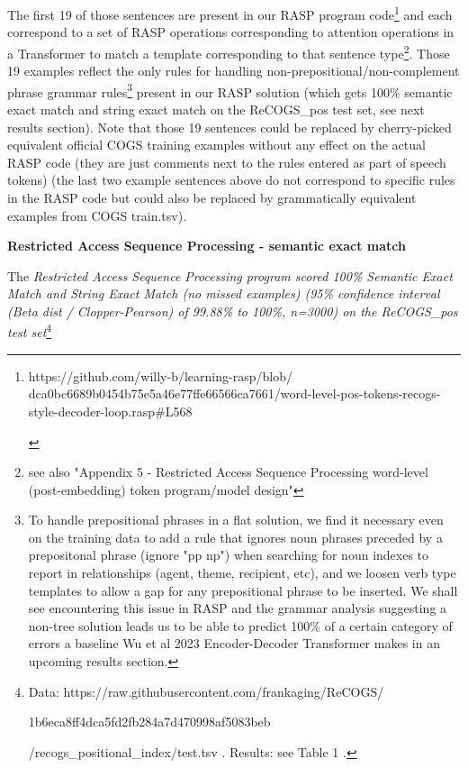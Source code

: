 \documentclass[11pt]{article}
\begin{document}
The first 19 of those sentences are present in our RASP program code\footnote{
\begin{tiny}
https://github.com/willy-b/learning-rasp/blob/
dca0bc6689b0454b75e5a46e77ffe66566ca7661/word-level-pos-tokens-recogs-style-decoder-loop.rasp\#L568\end{tiny}}
and each correspond to a set of RASP operations corresponding to attention operations in a Transformer to match a template corresponding to that sentence type\footnote{see also "Appendix 5 - Restricted Access Sequence Processing word-level (post-embedding) token program/model design"}. Those 19 examples reflect the only rules for handling non-prepositional/non-complement phrase grammar rules\footnote{To handle prepositional phrases in a flat solution, we find it necessary even on the training data to add a rule that ignores noun phrases preceded by a prepositonal phrase (ignore "pp np") when searching for noun indexes to report in relationships (agent, theme, recipient, etc), and we loosen verb type templates to allow a gap for any prepositional phrase to be inserted. We shall see encountering this issue in RASP and the grammar analysis suggesting a non-tree solution leads us to be able to predict 100\% of a certain category of errors a baseline Wu et al 2023 Encoder-Decoder Transformer makes in an upcoming results section.} present in our RASP solution (which gets 100\% semantic exact match and string exact match on the \cite{Wu2023} ReCOGS\_pos test set, see next results section). Note that those 19 sentences could be replaced by cherry-picked equivalent official COGS training examples without any effect on the actual RASP code (they are just comments next to the rules entered as part of speech tokens) (the last two example sentences above do not correspond to specific rules in the RASP code but could also be replaced by grammatically equivalent examples from COGS train.tsv).

\textbf{ Restricted Access Sequence Processing - semantic exact match}

The \textit{Restricted Access Sequence Processing program scored 100\% Semantic Exact Match and String Exact Match (no missed examples) (95\% confidence interval (Beta dist / Clopper-Pearson) of 99.88\% to 100\%, n=3000) on the ReCOGS\_pos test set}\footnote{ Data: https://raw.githubusercontent.com/frankaging/ReCOGS/

1b6eca8ff4dca5fd2fb284a7d470998af5083beb

/recogs\_positional\_index/test.tsv . Results: see Table 1 .} 
\end{document}
